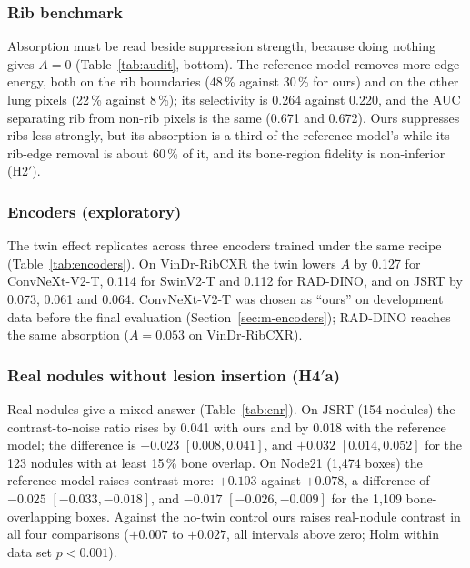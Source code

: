 \subsubsection{Rib benchmark}
Absorption must be read beside suppression strength, because doing nothing gives $A=0$ (Table~\ref{tab:audit}, bottom). The reference model
removes more edge energy, both on the rib boundaries (48\,\% against 30\,\% for ours) and on the other lung pixels (22\,\% against 8\,\%);
its selectivity is 0.264 against 0.220, and the AUC separating rib from non-rib pixels is the same (0.671 and 0.672). Ours suppresses ribs
less strongly, but its absorption is a third of the reference model's while its rib-edge removal is about 60\,\% of it, and its bone-region
fidelity is non-inferior (H2$'$).

\subsubsection{Encoders (exploratory)}
The twin effect replicates across three encoders trained under the same recipe (Table~\ref{tab:encoders}). On VinDr-RibCXR the twin lowers
$A$ by 0.127 for ConvNeXt-V2-T, 0.114 for SwinV2-T and 0.112 for RAD-DINO, and on JSRT by 0.073, 0.061 and 0.064. ConvNeXt-V2-T was chosen
as ``ours'' on development data before the final evaluation (Section~\ref{sec:m-encoders}); RAD-DINO reaches the same absorption ($A=0.053$
on VinDr-RibCXR).

\begin{table}[!t]
\centering
\caption{Twin regulariser per encoder (exploratory): absorption difference to the matched no-twin control and its interaction with bone
overlap; three seeds per model (seeds 0--2), SZCH on its 51 held-out images. The single seeds of the final models are in
Supplementary Table~S4.}
\label{tab:encoders}
\end{table}

\subsubsection{Real nodules without lesion insertion (H4$'$a)}
Real nodules give a mixed answer (Table~\ref{tab:cnr}). On JSRT (154 nodules) the contrast-to-noise ratio rises by 0.041 with ours and by
0.018 with the reference model; the difference is $+0.023$ $[0.008,0.041]$, and $+0.032$ $[0.014,0.052]$ for the 123 nodules with at least
15\,\% bone overlap. On Node21 (1,474 boxes) the reference model raises contrast more: $+0.103$ against $+0.078$, a difference of $-0.025$
$[-0.033,-0.018]$, and $-0.017$ $[-0.026,-0.009]$ for the 1,109 bone-overlapping boxes. Against the no-twin control ours raises real-nodule
contrast in all four comparisons ($+0.007$ to $+0.027$, all intervals above zero; Holm within data set $p<0.001$).

